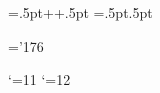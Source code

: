 \newbox\PPbox %
\setbox\PPbox=\hbox{\kern.5pt\hbox{\sevenrm+\kern-1pt+}\kern.5pt}
\def\PP{\copy\PPbox}
\newbox\MMbox %
\setbox\MMbox=\hbox{\kern.5pt\hbox{\sevensy{}\kern-1pt}\kern.5pt}
\def\MM{\copy\MMbox}

\newbox\MGbox
\setbox\MGbox=\hbox{\kern-2pt\hbox{\teni\char'176}\kern1pt}
\def\MG{\copy\MGbox}

\catcode`\@=11
\def\vc@lon#1#2{%
  \setbox\z@\hbox{$\m@th#1{:}$}%
  \setbox\tw@\hbox{$\m@th#1{=}$}%
  \dimen@=\ht\tw@   \advance\dimen@  -\dp\tw@   %
  \dimen@ii=\ht\z@  \advance\dimen@ii-\dp\z@    %
  \advance\dimen@ -\dimen@ii
  \advance\dimen@ .32\ht\tw@
  \raise.5\dimen@\box\z@}
\def\vcentcolon{\mathrel{\mathpalette\vc@lon\relax}}
\def\coloneqq{\mathrel{\vcentcolon\mkern-1.3mu=}}
\catcode`\@=12

\def\K{\coloneqq}

\def\AN{\oslash}

